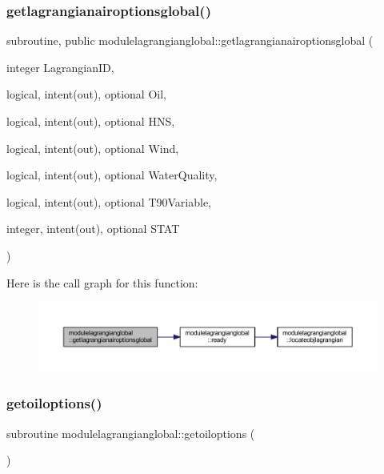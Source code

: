 \subsubsection{\texorpdfstring{getlagrangianairoptionsglobal()}{getlagrangianairoptionsglobal()}}
{\footnotesize\ttfamily subroutine, public modulelagrangianglobal\+::getlagrangianairoptionsglobal (\begin{DoxyParamCaption}\item[{integer}]{Lagrangian\+ID,  }\item[{logical, intent(out), optional}]{Oil,  }\item[{logical, intent(out), optional}]{H\+NS,  }\item[{logical, intent(out), optional}]{Wind,  }\item[{logical, intent(out), optional}]{Water\+Quality,  }\item[{logical, intent(out), optional}]{T90\+Variable,  }\item[{integer, intent(out), optional}]{S\+T\+AT }\end{DoxyParamCaption})}

Here is the call graph for this function\+:\nopagebreak
\begin{figure}[H]
\begin{center}
\leavevmode
\includegraphics[width=350pt]{namespacemodulelagrangianglobal_ad61d5f10ce5c10c555891aa6da16a247_cgraph}
\end{center}
\end{figure}
\mbox{\label{namespacemodulelagrangianglobal_a64f08b972c519197b497942c12d54fd5}} 
\subsubsection{\texorpdfstring{getoiloptions()}{getoiloptions()}}
{\footnotesize\ttfamily subroutine modulelagrangianglobal\+::getoiloptions (\begin{DoxyParamCaption}{ }\end{DoxyParamCaption})\hspace{0.3cm}{\ttfamily [private]}}

